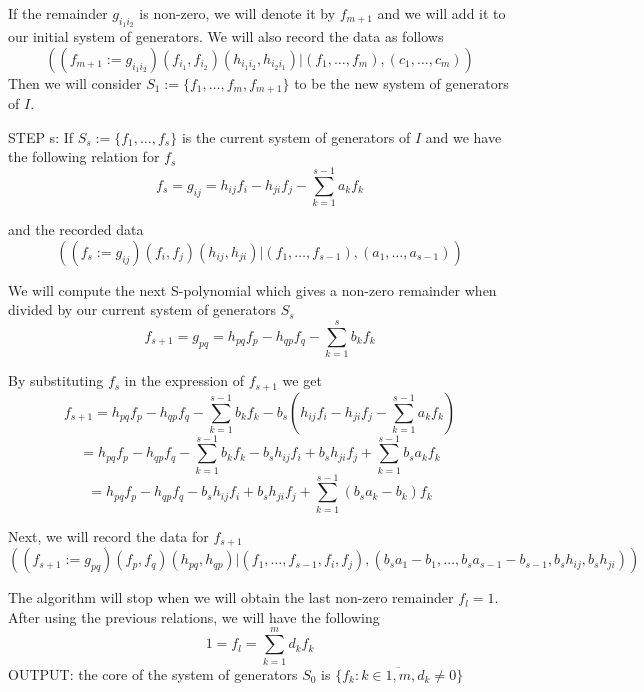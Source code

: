 If the remainder $g_{i_1i_2}$ is non-zero, we will denote it by $f_{m+1}$ and we will add it to our initial system of generators. We will also record the data as follows
$$((f_{m+1}:=g_{i_1i_2})(f_{i_1},f_{i_2})(h_{i_1i_2},h_{i_2i_1})| (f_1,\ldots,f_m),(c_1,\ldots,c_m))$$ 
Then we will consider $S_1:=\{f_1,\ldots,f_m,f_{m+1}\}$ to be the new system of generators of $I$.

STEP s:  If $S_s:=\{f_1,\ldots,f_{s}\}$ is the current system of generators of $I$ and we have the following relation for $f_s$
$$f_s=g_{ij}=h_{ij}f_i-h_{ji}f_j-\displaystyle\sum_{k=1}^{s-1} a_kf_k$$

and the recorded data 
$$((f_{s}:=g_{ij})(f_{i},f_{j})(h_{ij},h_{ji})| (f_1,\ldots,f_{s-1}),(a_1,\ldots,a_{s-1}))$$

We will compute the next S-polynomial which gives a non-zero remainder when divided by our current system of generators $S_s$
$$f_{s+1}=g_{pq}=h_{pq}f_p-h_{qp}f_q-\displaystyle\sum_{k=1}^s b_kf_k$$
  
By substituting $f_s$ in the expression of $f_{s+1}$ we get 
$$f_{s+1}= h_{pq}f_p-h_{qp}f_q-\displaystyle\sum_{k=1}^{s-1} b_kf_k-b_s(h_{ij}f_i-h_{ji}f_j-\displaystyle\sum_{k=1}^{s-1} a_kf_k)$$
$$= h_{pq}f_p-h_{qp}f_q-\displaystyle\sum_{k=1}^{s-1} b_kf_k-b_sh_{ij}f_i+b_sh_{ji}f_j+\displaystyle\sum_{k=1}^{s-1} b_sa_kf_k$$
$$= h_{pq}f_p-h_{qp}f_q-b_sh_{ij}f_i+b_sh_{ji}f_j+\displaystyle\sum_{k=1}^{s-1} (b_sa_k-b_k)f_k$$

 Next, we will record the data for $f_{s+1}$
$$((f_{s+1}:=g_{pq})(f_{p},f_{q})(h_{pq},h_{qp})| (f_1,\ldots,f_{s-1},f_i,f_j),(b_sa_1-b_1,\ldots,b_sa_{s-1}-b_{s-1},b_sh_{ij},b_sh_{ji}))$$


The algorithm will stop when we will obtain the last non-zero remainder $f_l=1$. After using the previous relations, we will have the following
$$1=f_l=\displaystyle\sum_{k=1}^{m} d_kf_k$$
OUTPUT:
the core of the system of generators $S_0$ is $\{f_k: k\in\overline{1,m}, d_k\neq 0\}$
        
